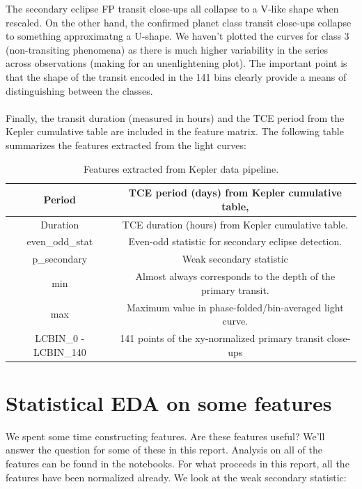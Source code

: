 \documentclass{article}
\begin{document}
The secondary eclipse FP transit close-ups all collapse to a V-like shape when rescaled. On the other hand, the confirmed planet class transit close-ups collapse to something approximatng a U-shape. We haven't plotted the curves for class 3 (non-transiting phenomena) as there is much higher variability in the series across observations (making for an unenlightening plot). The important point is that the shape of the transit encoded in the 141 bins clearly provide a means of distinguishing between the classes.
\paragraph{} Finally, the transit duration (measured in hours) and the TCE period from the Kepler cumulative table are included in the feature matrix. The following table summarizes the features extracted from the light curves:

\begin{table}[H]
	\begin{tabular}{|c|c|}
		\hline
		Period &  TCE period (days) from Kepler cumulative table,\\
		\hline
		Duration & TCE duration (hours) from Kepler cumulative table. \\
		\hline
		even\_odd\_stat & Even-odd statistic for secondary eclipse detection. \\
		\hline
		p\_secondary & Weak secondary statistic  \\
		\hline
		min & Almost always corresponds to the depth of the primary transit.  \\
		\hline
		max & Maximum value in phase-folded/bin-averaged light curve. \\
		\hline
		LCBIN\_0 - LCBIN\_140 & 141 points of the xy-normalized primary transit close-ups  \\
		\hline
	\end{tabular}
\caption{Features extracted from Kepler data pipeline.}
\end{table}
\section{Statistical EDA on some features}
We spent some time constructing features. Are these features useful? We'll answer the question for some of these in this report. Analysis on all of the features can be found in the notebooks. For what proceeds in this report, all the features have been normalized already. We look at the weak secondary statistic:
\end{document}
